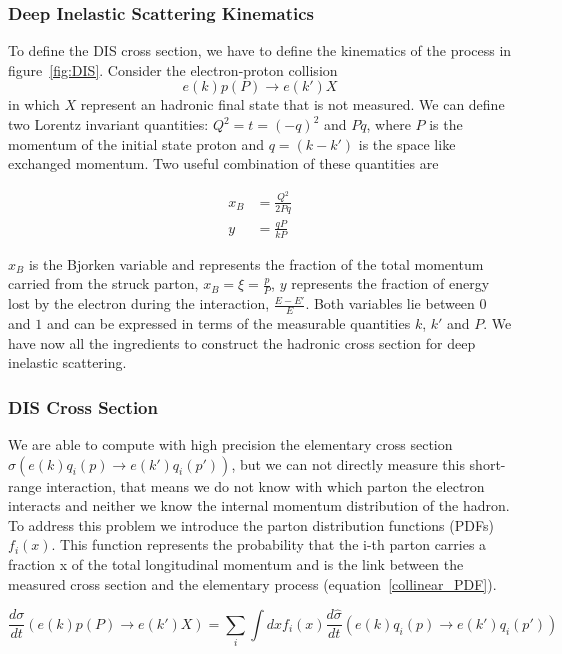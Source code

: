 \subsubsection{Deep Inelastic Scattering Kinematics}
To define the DIS cross section, we have to define the kinematics of the process in figure~\ref{fig:DIS}. Consider the electron-proton collision $$e(k)p(P) \to e(k') X$$ in which $X$ represent an hadronic final state that is not measured. We can define two Lorentz invariant quantities: $Q^2 = t = (-q)^2$ and $P \dot q$, where $P$ is the momentum of the initial state proton and $q = (k-k')$ is the space like exchanged momentum. Two useful combination of these quantities are 

\begin{align}
x_B &= \frac{Q^2}{2Pq} \\
y     &= \frac{qP}{kP}
\end{align}

$x_B$ is the Bjorken variable and represents the fraction of the total momentum carried from the struck parton, $x_B=\xi = \frac{p}{P}$, $y$ represents the fraction of energy lost by the electron during the interaction, $\frac{E-E'}{E}$. Both variables lie between $0$ and $1$ and can be expressed in terms of the measurable quantities $k$, $k'$ and $P$. We have now all the ingredients to construct the hadronic cross section for deep inelastic scattering.

\subsubsection[DIS cross section]{DIS Cross Section}
We are able to compute with high precision the elementary cross section $\hat{\sigma}(e(k)q_i(p) \to e(k') q_i(p'))$, but we can not directly measure this short-range interaction, that means we do not know with which parton the electron interacts and neither we know the internal momentum distribution of the hadron. To address this problem we introduce the parton distribution functions (PDFs) $f_i(x)$. This function represents the probability that the i-th parton carries a fraction x of the total longitudinal momentum and is the link between the measured cross section and the elementary process (equation~\eqref{collinear_PDF}).

\begin{equation}
\label{collinear_PDF}
\frac{d \sigma}{dt}(e(k)p(P) \to e(k') X) =\sum_i \int dx f_i(x) \frac{d\hat{\sigma}}{dt}(e(k)q_i(p) \to e(k') q_i(p')) 
\end{equation}
  































